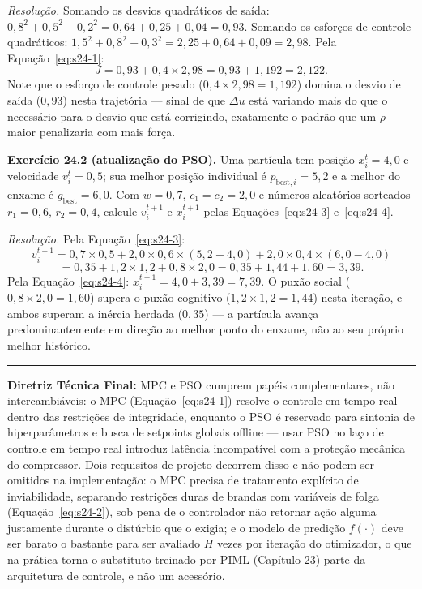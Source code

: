 \documentclass[12pt,a4paper]{article}
\numberwithin{equation}{section}
\numberwithin{table}{section}
\numberwithin{figure}{section}
\begin{document}
{	\emph{Resolução.} Somando os desvios quadráticos de saída:
	$0{,}8^2+0{,}5^2+0{,}2^2 = 0{,}64+0{,}25+0{,}04 = 0{,}93$. Somando os
	esforços de controle quadráticos:
	$1{,}5^2+0{,}8^2+0{,}3^2 = 2{,}25+0{,}64+0{,}09 = 2{,}98$. Pela
	Equação~\eqref{eq:s24-1}:
	$$J = 0{,}93 + 0{,}4 \times 2{,}98 = 0{,}93 + 1{,}192 = 2{,}122.$$
	Note que o esforço de controle pesado ($0{,}4 \times 2{,}98=1{,}192$)
	domina o desvio de saída ($0{,}93$) nesta trajetória --- sinal de que
	$\Delta u$ está variando mais do que o necessário para o desvio que
	está corrigindo, exatamente o padrão que um $\rho$ maior penalizaria
	com mais força.

	\textbf{Exercício 24.2 (atualização do PSO).} Uma partícula tem
	posição $x_i^t=4{,}0$ e velocidade $v_i^t=0{,}5$; sua melhor posição
	individual é $p_{\text{best},i}=5{,}2$ e a melhor do enxame é
	$g_{\text{best}}=6{,}0$. Com $w=0{,}7$, $c_1=c_2=2{,}0$ e números
	aleatórios sorteados $r_1=0{,}6$, $r_2=0{,}4$, calcule $v_i^{t+1}$ e
	$x_i^{t+1}$ pelas Equações~\eqref{eq:s24-3} e~\eqref{eq:s24-4}.

	\emph{Resolução.} Pela Equação~\eqref{eq:s24-3}:
	$$v_i^{t+1} = 0{,}7 \times 0{,}5 + 2{,}0 \times 0{,}6 \times
	(5{,}2-4{,}0) + 2{,}0 \times 0{,}4 \times (6{,}0-4{,}0)$$
	$$= 0{,}35 + 1{,}2 \times 1{,}2 + 0{,}8 \times 2{,}0 = 0{,}35+1{,}44+1{,}60
	= 3{,}39.$$
	Pela Equação~\eqref{eq:s24-4}: $x_i^{t+1} = 4{,}0 + 3{,}39 = 7{,}39$.
	O puxão social ($0{,}8\times 2{,}0=1{,}60$) supera o puxão cognitivo
	($1{,}2\times 1{,}2=1{,}44$) nesta iteração, e ambos superam a
	inércia herdada ($0{,}35$) --- a partícula avança predominantemente
	em direção ao melhor ponto do enxame, não ao seu próprio melhor
	histórico.

	\vspace{1em}
	\hrule
	\vspace{1em}

	\textbf{Diretriz Técnica Final:} MPC e PSO cumprem papéis complementares, não intercambiáveis: o MPC (Equação~\eqref{eq:s24-1}) resolve o controle em tempo real dentro das restrições de integridade, enquanto o PSO é reservado para sintonia de hiperparâmetros e busca de setpoints globais offline — usar PSO no laço de controle em tempo real introduz latência incompatível com a proteção mecânica do compressor. Dois requisitos de projeto decorrem disso e não podem ser omitidos na implementação: o MPC precisa de tratamento explícito de inviabilidade, separando restrições duras de brandas com variáveis de folga (Equação~\eqref{eq:s24-2}), sob pena de o controlador não retornar ação alguma justamente durante o distúrbio que o exigia; e o modelo de predição $f(\cdot)$ deve ser barato o bastante para ser avaliado $H$ vezes por iteração do otimizador, o que na prática torna o substituto treinado por PIML (Capítulo 23) parte da arquitetura de controle, e não um acessório.

}
\end{document}
